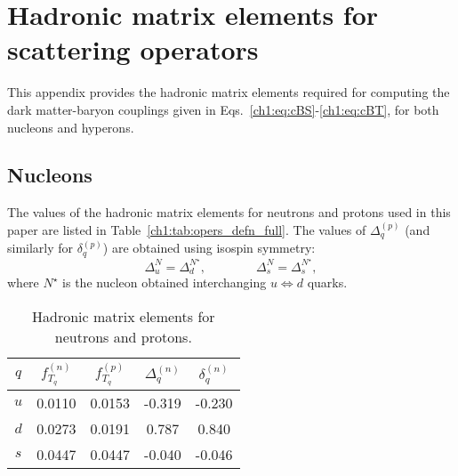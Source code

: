 \chapter{Hadronic matrix elements for scattering operators}
\label{appendix:hadronic_matrix_elements}

This appendix provides the hadronic matrix elements required for computing the dark matter-baryon couplings given in Eqs.~\ref{ch1:eq:cBS}-\ref{ch1:eq:cBT}, for both nucleons and hyperons.


\section{Nucleons}
The values of the hadronic matrix elements for neutrons and protons used in this paper are listed in Table~\ref{ch1:tab:opers_defn_full}. The values of $\Delta_q^{(p)}$ (and similarly for $\delta_q^{(p)}$) are obtained using isospin symmetry: 
\begin{equation}
\Delta_u^{N} =\Delta_d^{N^\star},\qquad \qquad
\Delta_s^{N} = \Delta_s^{N^\star},
\end{equation}
where $N^\star$ is the nucleon obtained interchanging $u\Longleftrightarrow d$ quarks.

\begin{table}[th]
    \centering
    \begin{tabular}{ c c c c c }
    \toprule
     $q$ & $f_{T_q}^{(n)}$ \cite{Belanger:2013oya_MicrOMEGAs3programcalculating} & $f_{T_q}^{(p)}$ \cite{Belanger:2013oya_MicrOMEGAs3programcalculating} & $\Delta^{(n)}_q$ & $\delta^{(n)}_q$ \cite{Belanger:2013oya_MicrOMEGAs3programcalculating} \\ 
     \midrule\midrule
     $u$  & 0.0110 & 0.0153     & -0.319 \cite{QCDSF:2011aa_Strangenesscontributionproton} & -0.230 \\ 
     $d$ & 0.0273  & 0.0191     & 0.787 \cite{QCDSF:2011aa_Strangenesscontributionproton} & 0.840 \\ 
     $s$ & 0.0447  & 0.0447     & -0.040 \cite{Dienes:2013xya_Overcomingvelocitysuppression} & -0.046 \\ \bottomrule
    \end{tabular}
    \caption{Hadronic matrix elements for neutrons and protons. }
    \label{tab:hadmatelem}
\end{table}

